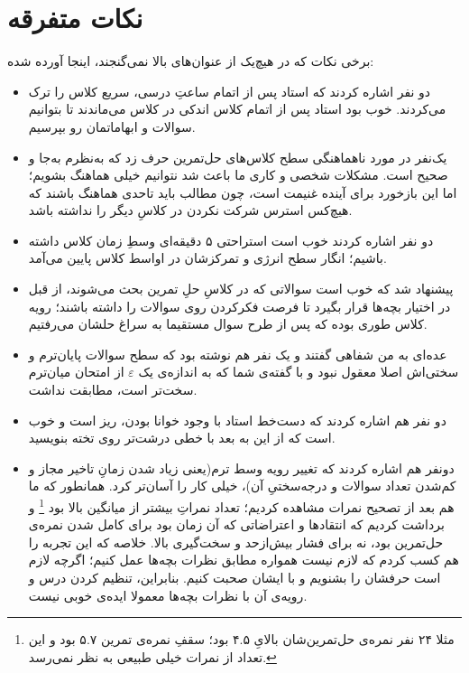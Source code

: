 \documentclass[]{article}
\numberwithin{equation}{section}
\begin{document}
\section*{نکات متفرقه}
برخی نکات که در هیچ‌یک از عنوان‌های بالا نمی‌گنجند، اینجا آورده شده:
\begin{itemize}
	\item دو نفر اشاره کردند که  استاد پس از اتمام ساعتِ درسی، سریع کلاس را ترک می‌کردند. خوب بود استاد پس از اتمام کلاس اندکی در کلاس می‌ماندند تا بتوانیم سوالات و ابهاماتمان رو بپرسیم.
	
	\item
	یک‌نفر در مورد ناهماهنگی سطح کلاس‌های حل‌تمرین حرف زد که به‌نظرم به‌جا و صحیح است. مشکلات شخصی و کاری ما باعث شد نتوانیم خیلی هماهنگ بشویم؛ اما این بازخورد برای آینده غنیمت است، چون مطالب باید تاحدی هماهنگ باشند که هیچ‌کس استرس شرکت نکردن در کلاسِ دیگر را نداشته باشد.
	\item
	دو نفر اشاره کردند خوب است استراحتی ۵ دقیقه‌ای وسطِ زمان کلاس داشته باشیم؛ انگار سطح انرژی و تمرکزشان در اواسط کلاس پایین می‌آمد.
	
	\item پیشنهاد شد که خوب است سوالاتی که در کلاسِ حلِ تمرین بحث می‌شوند، 
	از قبل در اختیار بچه‌ها قرار بگیرد تا فرصت فکرکردن روی سوالات را داشته باشند؛ رویه کلاس طوری بوده که پس از طرح سوال مستقیما به سراغ حلشان می‌رفتیم.
	\item 
	عده‌ای به من شفاهی گفتند و یک نفر هم نوشته بود که سطح سوالات پایان‌ترم و سختی‌اش اصلا معقول نبود و با گفته‌ی شما که به اندازه‌ی یک
	$\varepsilon$
	  از امتحان میان‌ترم سخت‌تر است، مطابقت نداشت.
	\item 
	دو نفر هم اشاره کردند که دست‌خط استاد با وجود خوانا بودن، ریز است و خوب است که از این به بعد با خطی درشت‌تر روی تخته بنویسید.
	\item 
	دونفر هم اشاره کردند که تغییر رویه وسط ترم(یعنی زیاد شدن زمانِ تاخیر مجاز و کم‌شدن تعداد سوالات و درجه‌سختیِ آن)، خیلی کار را آسان‌تر کرد. همانطور که ما هم بعد از تصحیح نمرات مشاهده کردیم؛ تعداد نمراتِ بیشتر از میانگین بالا بود 
	\footnote{مثلا ۲۴ نفر نمره‌ی حل‌تمرین‌شان بالایِ  ۴.۵  بود؛ سقفِ نمره‌ی تمرین  ۵.۷ بود و این تعداد از نمرات خیلی طبیعی به نظر نمی‌رسد.}
	و برداشت کردیم که انتقادها و اعتراضاتی که آن زمان بود برای کامل شدن نمره‌ی حل‌تمرین بود، نه برای فشار بیش‌ازحد و سخت‌گیری بالا. خلاصه‌ که این تجربه را هم کسب کردم که لازم نیست همواره مطابق نظرات بچه‌ها عمل کنیم؛ اگرچه لازم است حرفشان را بشنویم و با ایشان صحبت کنیم. بنابراین، تنظیم کردن درس و رویه‌ی آن با نظرات بچه‌ها معمولا ایده‌ی خوبی نیست.
\end{itemize}
\end{document}
